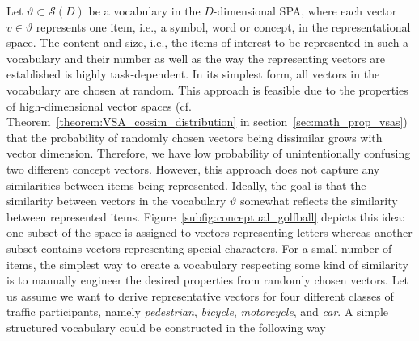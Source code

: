 Let $\vartheta \subset \mathcal{S}(D)$ be a vocabulary in the $D$-dimensional \ac{SPA}, where each vector $v \in \vartheta$ represents one item, i.e., a symbol, word or concept, in the representational space.
The content and size, i.e., the items of interest to be represented in such a vocabulary and their number as well as the way the representing vectors are established is highly task-dependent.
In its simplest form, all vectors in the vocabulary are chosen at random.
This approach is feasible due to the properties of high-dimensional vector spaces (cf. Theorem~\ref{theorem:VSA_cossim_distribution} in section~\ref{sec:math_prop_vsas}) that the probability of randomly chosen vectors being dissimilar grows with vector dimension.
Therefore,  we have low probability of unintentionally confusing two different concept vectors.
However, this approach does not capture any similarities between items being represented.
Ideally, the goal is that the similarity between vectors in the vocabulary $\vartheta$ somewhat reflects the similarity between represented items.
Figure~\ref{subfig:conceptual_golfball} depicts this idea: one subset of the space is assigned to vectors representing letters whereas another subset contains vectors representing special characters.
For a small number of items, the simplest way to create a vocabulary respecting some kind of similarity is to manually engineer the desired properties from randomly chosen vectors.
Let us assume we want to derive representative vectors for four different classes of traffic participants, namely \emph{pedestrian}, \emph{bicycle}, \emph{motorcycle},  and \emph{car}.
A simple structured vocabulary could be constructed in the following way

